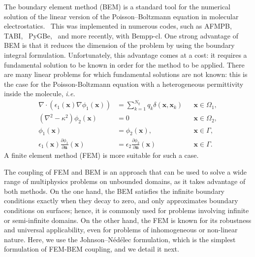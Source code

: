 
The boundary element method (BEM) is a standard tool for the numerical solution of the linear version of the Poisson--Boltzmann equation in molecular electrostatics.~\cite{ZauharMorgan1985, Shaw1985} This was implemented in numerous codes, such as AFMPB,~\cite{LuETal2006} TABI,~\cite{GengKrasny2013} PyGBe,~\cite{CooperBardhanBarba2014,cooper2016pygbe} and more recently, with Bempp-cl\cite{search2022towards}. One strong advantage of BEM is that it reduces the dimension of the problem by using the boundary integral formulation. Unfortunately, this advantage comes at a cost: it requires a fundamental solution to be known in order for the method to be applied. There are many linear problems for which fundamental solutions are not known: this is the case for the Poisson-Boltzmann equation with a heterogeneous permittivity inside the molecule, \emph{i.e.}
%
\begin{align} \label{eq:pbe_vp}
\nabla \cdot \left(\epsilon_1(\mathbf{x}) \nabla \phi_1(\mathbf{x})\right) &= \sum_{k=1}^{N_q} q_k\delta(\mathbf{x},\mathbf{x}_k) &&\mathbf{x} \in \Omega_1,\nonumber\\
\left(\nabla^2 - \kappa^2\right)\phi_2(\mathbf{x})  &= 0 &&\mathbf{x}\in\Omega_2,\nonumber\\
\phi_1(\mathbf{x})  &= \phi_2(\mathbf{x}),&&\mathbf{x}\in \Gamma,\nonumber\\
\epsilon_1(\mathbf{x})\frac{\partial\phi_1}{\partial\mathbf{n}}(\mathbf{x})  &= \epsilon_2\frac{\partial\phi_2}{\partial\mathbf{n}}(\mathbf{x}) &&\mathbf{x}\in \Gamma. 
\end{align}
%
A finite element method (FEM) is more suitable for such a case.

The coupling of FEM and BEM is an approach that can be used to solve a wide range of multiphysics problems on unbounded domains\cite{hiptmair2002,banjai2015}, as it takes advantage of both methods. On the one hand, the BEM satisfies the infinite boundary conditions exactly when they decay to zero, and only approximates boundary conditions on surfaces; hence, it is commonly used for problems involving infinite or semi-infinite domains. On the other hand, the FEM is known for its robustness and universal applicability, even for problems of inhomogeneous or non-linear nature.
Here, we use the Johnson--N\'ed\'elec formulation,\cite{johnson1980coupling} which is the simplest formulation of FEM-BEM coupling, and we detail it next.


